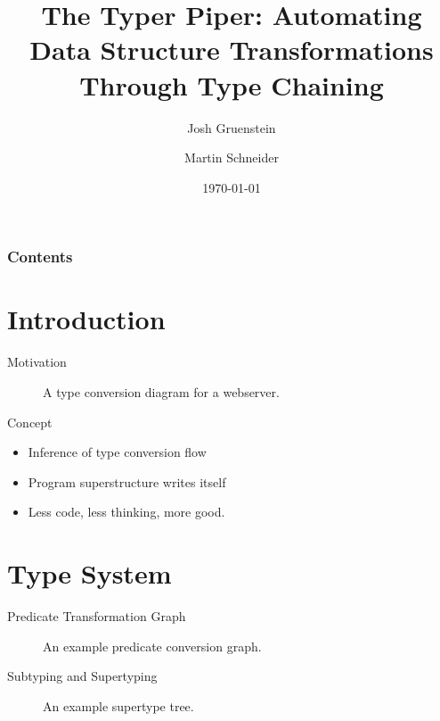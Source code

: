 \documentclass[11pt]{beamer}
\date{\today}
\title[6.905 Final Project]{The Typer Piper: Automating Data Structure Transformations Through Type Chaining}
\author[Gruenstein \and Schneider]{
    Josh Gruenstein \and Martin Schneider
}
\begin{document}
\begin{frame}
\titlepage 

\end{frame}

\begin{frame}
\frametitle{Contents} 
\tableofcontents 
\end{frame}

\section{Introduction} 
\begin{frame}{Motivation}
    \begin{figure}[h!]
        \centering

        \resizebox{10cm}{!} {
          
        }

        \caption{A type conversion diagram for a webserver.}
    \end{figure}
\end{frame}

\begin{frame}{Concept}
    \begin{itemize}
        \item Inference of type conversion flow
        \medskip
        \item Program superstructure writes itself
        \medskip
        \item Less code, less thinking, more good.
    \end{itemize}
\end{frame}

\section{Type System} 

\begin{frame}{Predicate Transformation Graph}
    \begin{figure}[h!]
        \centering

        \resizebox{6cm}{!} {
          
        }

        \caption{An example predicate conversion graph.}
    \end{figure}
\end{frame}

\begin{frame}{Subtyping and Supertyping}
    \begin{figure}[h!]
        \centering

        \resizebox{!}{5cm} {
          
        }

        \caption{An example supertype tree.}
    \end{figure}

\end{frame}
\end{document}
